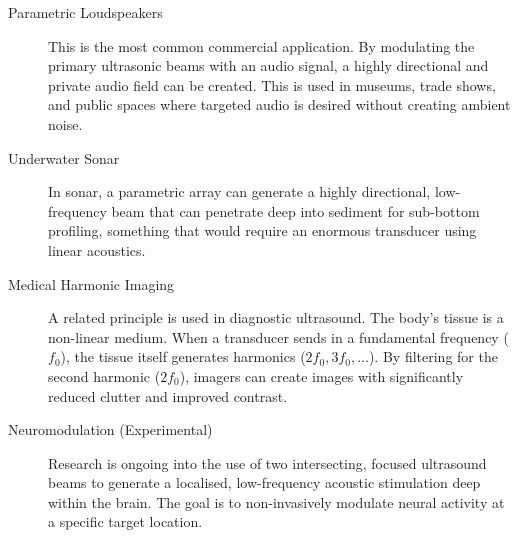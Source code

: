 \begin{description}
    \item[Parametric Loudspeakers] This is the most common commercial application. By modulating the primary ultrasonic beams with an audio signal, a highly directional and private audio field can be created. This is used in museums, trade shows, and public spaces where targeted audio is desired without creating ambient noise.
    
    \item[Underwater Sonar] In sonar, a parametric array can generate a highly directional, low-frequency beam that can penetrate deep into sediment for sub-bottom profiling, something that would require an enormous transducer using linear acoustics.
    
    \item[Medical Harmonic Imaging] A related principle is used in diagnostic ultrasound. The body's tissue is a non-linear medium. When a transducer sends in a fundamental frequency ($f_0$), the tissue itself generates harmonics ($2f_0, 3f_0, \dots$). By filtering for the second harmonic ($2f_0$), imagers can create images with significantly reduced clutter and improved contrast.
    
    \item[Neuromodulation (Experimental)] Research is ongoing into the use of two intersecting, focused ultrasound beams to generate a localised, low-frequency acoustic stimulation deep within the brain. The goal is to non-invasively modulate neural activity at a specific target location.
\end{description}


